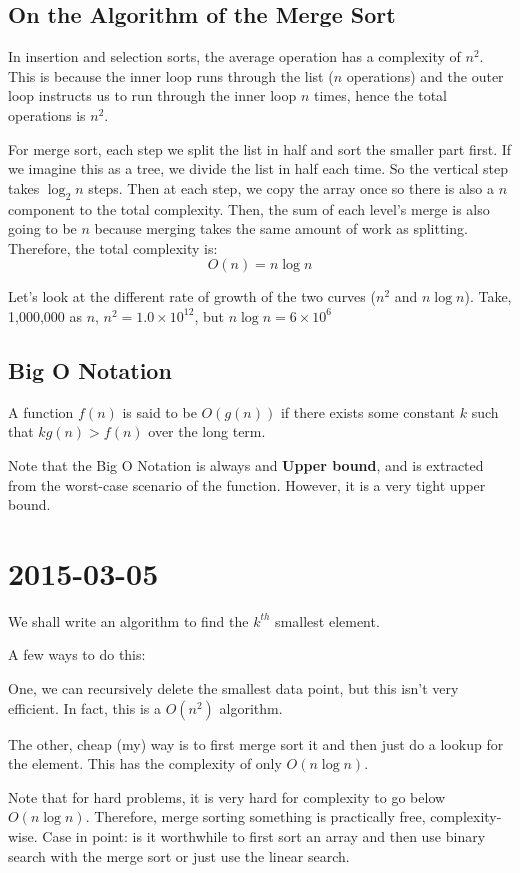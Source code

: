 \documentclass [12 pt, twoside] {article}
\begin{document}
\subsection{On the Algorithm of the Merge Sort}
In insertion and selection sorts, the average operation has a complexity of
$n^2$. This is because the inner loop runs through the list ($n$ operations)
and the outer loop instructs us to run through the inner loop $n$ times, hence
the total operations is $n^2$.

For merge sort, each step we split the list in half and sort the smaller part
first. If we imagine this as a tree, we divide the list in half each time. So
the vertical step takes $\log_2{n}$ steps. Then at each step, we copy the array
once so there is also a $n$ component to the total complexity. Then, the sum
of each level's merge is also going to be $n$ because merging takes the same
amount of work as splitting. Therefore, the total complexity is:
$$O(n) = n\log{n}$$

Let's look at the different rate of growth of the two curves ($n^2$ and
$n\log{n}$). Take, 1,000,000 as $n$, $n^2 = 1.0 \times 10^{12}$, but $n\log{n} = 6
\times 10^{6}$

\subsection{Big O Notation}
A function $f(n)$ is said to be $O(g(n))$ if there exists some constant $k$
such that $kg(n) > f(n)$ over the long term.

Note that the Big O Notation is always and \textbf{Upper bound}, and is
extracted from the worst-case scenario of the function. However, it is a very
tight upper bound.

\section{2015-03-05}
We shall write an algorithm to find the $k^{th}$ smallest element.

A few ways to do this:

One, we can recursively delete the smallest data point, but this isn't very
efficient. In fact, this is a $O(n^2)$ algorithm.

The other, cheap (my) way is to first merge sort it and then just do a lookup
for the element. This has the complexity of only $O(n\log{n})$.

Note that for hard problems, it is very hard for complexity to go below
$O(n\log{n})$. Therefore, merge sorting something is practically free,
complexity-wise. Case in point: is it worthwhile to first sort an array and
then use binary search with the merge sort or just use the linear search.
\end{document}
